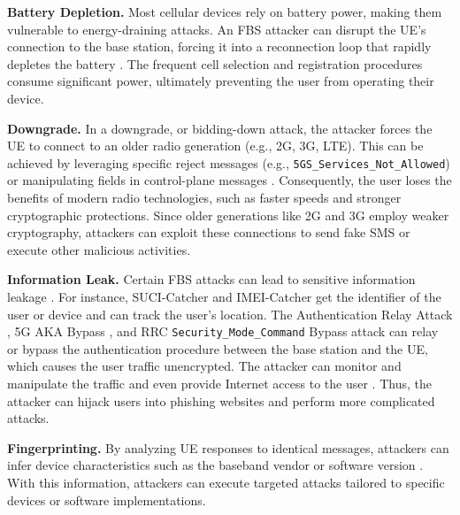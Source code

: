 \noindent \textbf{Battery Depletion.}
Most cellular devices rely on battery power, making them vulnerable to energy-draining attacks. An FBS attacker can disrupt the UE's connection to the base station, forcing it into a reconnection loop that rapidly depletes the battery \cite{shaik2015practical, hussain2018lteinspector, hussain20195greasoner, 3GPP:33.809, shaik2018impact}. The frequent cell selection and registration procedures consume significant power, ultimately preventing the user from operating their device.

\noindent \textbf{Downgrade.}
In a downgrade, or bidding-down attack, the attacker forces the UE to connect to an older radio generation (e.g., 2G, 3G, LTE). This can be achieved by leveraging specific reject messages (e.g., \texttt{5GS\_Services\_Not\_Allowed}) \cite{shaik2015practical, hussain2018lteinspector, hussain20195greasoner, 3GPP:33.809} or manipulating fields in control-plane messages \cite{shaik2018impact}. Consequently, the user loses the benefits of modern radio technologies, such as faster speeds and stronger cryptographic protections. Since older generations like 2G and 3G employ weaker cryptography, attackers can exploit these connections to send fake SMS or execute other malicious activities.

\noindent \textbf{Information Leak.}
Certain FBS attacks can lead to sensitive information leakage \cite{hussain2018lteinspector, 5gbasechecker, chlosta20215g, park2022doltest, kim2019touching}. For instance, SUCI-Catcher \cite{chlosta20215g} and IMEI-Catcher \cite{park2022doltest} get the identifier of the user or device and can track the user's location. The Authentication Relay Attack \cite{hussain2018lteinspector}, 5G AKA Bypass \cite{5gbasechecker}, and RRC \texttt{Security\_Mode\_Command} Bypass attack can relay or bypass the authentication procedure between the base station and the UE, which causes the user traffic unencrypted. The attacker can monitor and manipulate the traffic and even provide Internet access to the user \cite{5gbasechecker}. Thus, the attacker can hijack users into phishing websites and perform more complicated attacks. 

\noindent \textbf{Fingerprinting.}
By analyzing UE responses to identical messages, attackers can infer device characteristics such as the baseband vendor or software version \cite{5gbasechecker, park2022doltest, rashid2024state}. With this information, attackers can execute targeted attacks tailored to specific devices or software implementations. 

